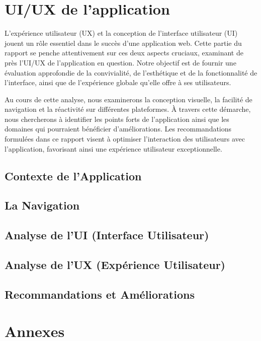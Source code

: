 \documentclass[12pt, a4paper, oneside]{Thesis}
\begin{document}
\newpage

\newpage

\section{UI/UX de l'application}
L'expérience utilisateur (UX) et la conception de l'interface utilisateur (UI) jouent un rôle essentiel dans le succès d'une application web. Cette partie du rapport se penche attentivement sur ces deux aspects cruciaux, examinant de près l'UI/UX de l'application en question. Notre objectif est de fournir une évaluation approfondie de la convivialité, de l'esthétique et de la fonctionnalité de l'interface, ainsi que de l'expérience globale qu'elle offre à ses utilisateurs.

Au cours de cette analyse, nous examinerons la conception visuelle, la facilité de navigation et la réactivité sur différentes plateformes. À travers cette démarche, nous chercherons à identifier les points forts de l'application ainsi que les domaines qui pourraient bénéficier d'améliorations. Les recommandations formulées dans ce rapport visent à optimiser l'interaction des utilisateurs avec l'application, favorisant ainsi une expérience utilisateur exceptionnelle.




\subsection{Contexte de l'Application}
\subsection{La Navigation}
\subsection{Analyse de l'UI (Interface Utilisateur)}
\subsection{Analyse de l'UX (Expérience Utilisateur)}
\subsection{Recommandations et Améliorations}









\section{Annexes}
\end{document}
